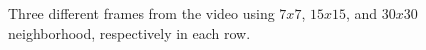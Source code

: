 \documentclass[12pt,a4paper]{article}
\begin{document}
\begin{figure}[!h]
	{
		{
			\setlength{\fboxsep}{1pt}
			\setlength{\fboxrule}{1pt}
		}
	}
	\enskip
	{
		{
			\setlength{\fboxsep}{1pt}
			\setlength{\fboxrule}{1pt}
		}	
	}
	\enskip
	{
		{
			\setlength{\fboxsep}{1pt}
			\setlength{\fboxrule}{1pt}
		}	
	}
	
	\caption{Three different frames from the video using $7x7$, $15x15$, and $30x30$ neighborhood, respectively in each row.}
	\label{fig:keypointSelection}
\end{figure}
\end{document}
